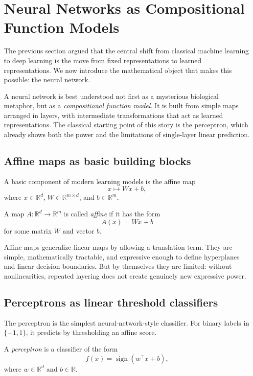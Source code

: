 \section{Neural Networks as Compositional Function Models}

The previous section argued that the central shift from classical machine learning to deep learning is the move from fixed representations to learned representations. We now introduce the mathematical object that makes this possible: the neural network.

A neural network is best understood not first as a mysterious biological metaphor, but as a \emph{compositional function model}. It is built from simple maps arranged in layers, with intermediate transformations that act as learned representations. The classical starting point of this story is the perceptron, which already shows both the power and the limitations of single-layer linear prediction.

\subsection*{Affine maps as basic building blocks}

A basic component of modern learning models is the affine map
\[
x \mapsto Wx+b,
\]
where $x\in\mathbb R^d$, $W\in\mathbb R^{m\times d}$, and $b\in\mathbb R^m$.

\begin{definition}
A map $A:\mathbb R^d\to\mathbb R^m$ is called \emph{affine} if it has the form
\[
A(x)=Wx+b
\]
for some matrix $W$ and vector $b$.
\end{definition}

Affine maps generalize linear maps by allowing a translation term. They are simple, mathematically tractable, and expressive enough to define hyperplanes and linear decision boundaries. But by themselves they are limited: without nonlinearities, repeated layering does not create genuinely new expressive power.

\subsection*{Perceptrons as linear threshold classifiers}

The perceptron is the simplest neural-network-style classifier. For binary labels in $\{-1,1\}$, it predicts by thresholding an affine score.

\begin{definition}[Perceptron]
A \emph{perceptron} is a classifier of the form
\[
f(x)=\operatorname{sign}(w^\top x+b),
\]
where $w\in\mathbb R^d$ and $b\in\mathbb R$.
\end{definition}

